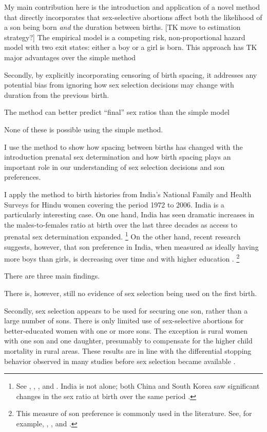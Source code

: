 \documentclass[12pt,letterpaper]{article}
\begin{document}
My main contribution here is the introduction and application
of a novel method that directly incorporates that sex-selective 
abortions affect both the likelihood of a son being born \emph{and} the 
duration between births.
[TK move to estimation strategy?]
The empirical model is a competing risk, non-proportional hazard model with 
two exit states: either a boy or a girl is born.
This approach has TK major advantages over the simple method 

Secondly, by explicitly incorporating censoring of birth spacing, it addresses any 
potential bias from ignoring how sex selection decisions may change with duration from 
the previous birth.

The method can better predict ``final'' sex ratios than the simple model

None of these is possible using the simple method.

I use the method to show how spacing between births has changed with
the introduction prenatal sex determination and how birth spacing plays 
an important role in our understanding of sex selection decisions and 
son preferences.


I apply the method to birth histories from India's National Family and Health 
Surveys for Hindu women covering the period 1972 to 2006. 
India is a particularly interesting case.
On one hand, India has seen dramatic increases in the males-to-females ratio 
at birth over the last three decades as access to prenatal sex determination 
expanded.%
\footnote{
See \citet{das_gupta97}, \citet{Sudha1999},
\citet{Arnold2002}, \cite{retherford03b} and \citet{jha06}.
India is not alone; both China and South Korea saw
significant changes in the sex ratio at birth over the same period \citep{Yi1993,park95}.
}
On the other hand, recent research suggests, however, that son preference in 
India, when measured as ideally having more boys than girls, is decreasing 
over time and with higher education \citep{bhat03,pande07}.%
\footnote{
This measure of son preference is commonly used in the literature. 
See, for example, \citet{clark00}, \citet{Jensen2009}, and \cite{Hu2015}.
}

There are three main findings.

There is, however, still no evidence of sex selection being used on the first birth.

Secondly, sex selection appears to be used for securing one son, rather than a large 
number of sons.
There is only limited use of sex-selective abortions for better-educated
women with one or more sons.
The exception is rural women with one son and one daughter, presumably to compensate for 
the higher child mortality in rural areas.
These results are in line with the differential stopping behavior observed in many studies
before sex selection became available \citep{repetto72,arnold98,dreze01}.
\end{document}
